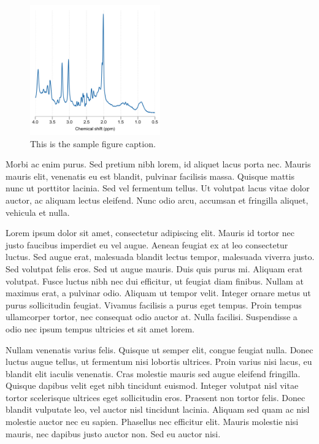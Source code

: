 \documentclass[AMA,STIX2COL,Linenumberson]{MRM}
\begin{document}
\begin{figure}[t]
\centerline{\includegraphics[width=0.5\textwidth]{FIGURES/Fig2.png}}
\caption{This is the sample figure caption.}\label{fig2}
\end{figure}

Morbi ac enim purus. Sed pretium nibh lorem, id aliquet lacus porta nec. Mauris mauris elit, venenatis eu est blandit, pulvinar facilisis massa. Quisque mattis nunc ut porttitor lacinia. Sed vel fermentum tellus. Ut volutpat lacus vitae dolor auctor, ac aliquam lectus eleifend. Nunc odio arcu, accumsan et fringilla aliquet, vehicula et nulla.

Lorem ipsum dolor sit amet, consectetur adipiscing elit. Mauris id tortor nec justo faucibus imperdiet eu vel augue. Aenean feugiat ex at leo consectetur luctus. Sed augue erat, malesuada blandit lectus tempor, malesuada viverra justo. Sed volutpat felis eros. Sed ut augue mauris. Duis quis purus mi. Aliquam erat volutpat. Fusce luctus nibh nec dui efficitur, ut feugiat diam finibus. Nullam at maximus erat, a pulvinar odio. Aliquam ut tempor velit. Integer ornare metus ut purus sollicitudin feugiat. Vivamus facilisis a purus eget tempus. Proin tempus ullamcorper tortor, nec consequat odio auctor at. Nulla facilisi. Suspendisse a odio nec ipsum tempus ultricies et sit amet lorem.

Nullam venenatis varius felis. Quisque ut semper elit, congue feugiat nulla. Donec luctus augue tellus, ut fermentum nisi lobortis ultrices. Proin varius nisi lacus, eu blandit elit iaculis venenatis. Cras molestie mauris sed augue eleifend fringilla. Quisque dapibus velit eget nibh tincidunt euismod. Integer volutpat nisl vitae tortor scelerisque ultrices eget sollicitudin eros. Praesent non tortor felis. Donec blandit vulputate leo, vel auctor nisl tincidunt lacinia. Aliquam sed quam ac nisl molestie auctor nec eu sapien. Phasellus nec efficitur elit. Mauris molestie nisi mauris, nec dapibus justo auctor non. Sed eu auctor nisi.
\end{document}
